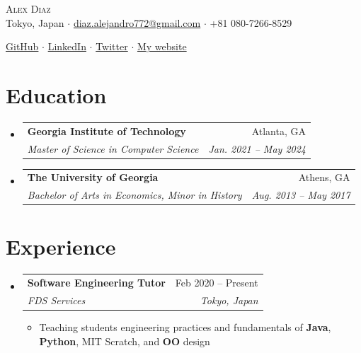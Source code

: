\documentclass[12pt, letterpaper]{article}
\makeatletter
\newcommand{\resumeItem}[1]{
  \item\small{
    {#1 \vspace{-2pt}}
  }
}
\newcommand{\resumeSubheading}[4]{
  \vspace{-2pt}\item
    \begin{tabular*}{0.97\textwidth}[t]{l@{\extracolsep{\fill}}r}
      \textbf{#1} & #2 \\
      \textit{\small#3} & \textit{\small #4} \\
    \end{tabular*}\vspace{-7pt}
}
\newcommand{\resumeSubHeadingListStart}{\begin{itemize}[leftmargin=0.15in, label={}]}
\newcommand{\resumeSubHeadingListEnd}{\end{itemize}}
\newcommand{\resumeItemListStart}{\begin{itemize}} %
\newcommand{\resumeItemListEnd}{\end{itemize}\vspace{-16pt}}
\makeatother
\begin{document}
\vspace*{-12pt}
\begin{center}
	{\Huge \scshape {Alex Diaz}}\\
	\vspace{1mm}
	\faMapMarker \hspace{.5mm} Tokyo, Japan $\cdot$ 
	\faEnvelope \hspace{.5mm} \href{mailto:diaz.alejandro772@gmail.com}{diaz.alejandro772@gmail.com} $\cdot$ \faMobile \hspace{.5mm} +81 080-7266-8529
		
	\faGithub \hspace{.5mm} \href{https://github.com/calmcoconut}{GitHub} $\cdot$
	\faLinkedin \hspace{.5mm} \href{https://www.linkedin.com/in/diazjalejandro/}{LinkedIn} $\cdot$
	\faTwitter \hspace{.5mm} \href{https://twitter.com/greetingsfriend}{Twitter} $\cdot$
    \faBriefcase \hspace{.5mm} \href{https://calmcoconut.github.io/diasDiaz/}{My website}
    \\
\end{center}


\section{Education}
  \resumeSubHeadingListStart
    \resumeSubheading
      {Georgia Institute of Technology}{Atlanta, GA}
      {Master of Science in Computer Science}{Jan. 2021 -- May 2024}
    \resumeSubheading
      {The University of Georgia}{Athens, GA}
      {Bachelor of Arts in Economics, Minor in History}{Aug. 2013 -- May 2017}
 \resumeSubHeadingListEnd

\section{Experience}

\resumeSubHeadingListStart
  \resumeSubheading
    {Software Engineering Tutor}{Feb 2020 -- Present}
    {FDS Services}{Tokyo, Japan}
    \resumeItemListStart
      \resumeItem{Teaching students engineering practices and fundamentals of \textbf{Java}, \textbf{Python}, MIT Scratch, and \textbf{OO} design}
    \resumeItemListEnd
    \resumeSubHeadingListEnd
\end{document}
